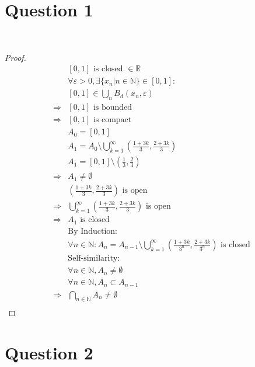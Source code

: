 \documentclass{article}
\begin{document}
\section*{Question 1}

~

\begin{proof}
    \begin{align*}
        &[0,1]\text{ is closed }\in \mathbb{R} \\
        &\forall \varepsilon>0,\exists \{x_n|n\in\mathbb{N} \}\in[0,1]:\\
        &[0,1]\in\bigcup_n B_d(x_n,\varepsilon)\\
        \Rightarrow&[0,1]\text{ is bounded}\\
        \Rightarrow&[0,1]\text{ is compact}\\
        &A_0=[0,1]\\
        &A_1=A_0\setminus\bigcup_{k=1}^{\infty}(\frac{1+3k}{3},\frac{2+3k}{3})\\
        &A_1=[0,1]\setminus(\frac{1}{3},\frac{2}{3})\\
        \Rightarrow&A_1\ne\emptyset\\
        &(\frac{1+3k}{3},\frac{2+3k}{3})\text{ is open}\\
        \Rightarrow&\bigcup_{k=1}^{\infty}(\frac{1+3k}{3},\frac{2+3k}{3})\text{ is open}\\
        \Rightarrow&A_1\text{ is closed}\\
        &\text{By Induction}:\\
        &\forall n\in\mathbb{N} :A_n=A_{n-1}\setminus\bigcup_{k=1}^{\infty}(\frac{1+3k}{3^n},\frac{2+3k}{3^n})\text{ is closed}\\
        &\text{Self-similarity}:\\
        &\forall n\in\mathbb{N}, A_n\ne\emptyset\\
        &\forall n\in\mathbb{N} ,A_n\subset A_{n-1}\\
        \Rightarrow&\bigcap_{n\in\mathbb{N} }A_n\ne \emptyset\\
    \end{align*}
\end{proof}

\newpage

\section*{Question 2}

~
\end{document}
